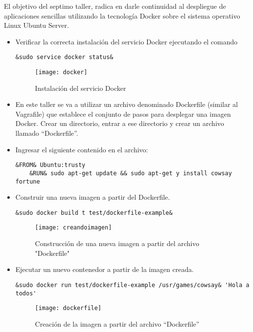 \documentclass[10pt]{article}   			%
\begin{document}
El objetivo del septimo taller, radica en darle continuidad al despliegue de aplicaciones sencillas utilizando la tecnología Docker sobre el sistema operativo Linux Ubuntu Server.

\begin{itemize}

\item Verificar la correcta instalación del servicio Docker ejecutando el comando
\begin{small}
\begin{lstlisting}[frame=single,style=base]	
	&sudo service docker status&
\end{lstlisting}
\end{small}
\begin{figure}[ht] 
	\centering
		\texttt{[image: docker]}   
	\caption{Instalación del servicio Docker} \label{fig:docker}
\end{figure}

\item En este taller se va a utilizar un archivo denominado Dockerfile (similar al Vagrafile) que establece el conjunto de pasos para desplegar una imagen Docker. Crear un directorio, entrar a ese directorio y crear un archivo llamado “Dockerfile”.

\item Ingresar el siguiente contenido en el archivo:
\begin{small}
\begin{lstlisting}[frame=single,style=base]	
	&FROM& Ubuntu:trusty
	&RUN& sudo apt-get update && sudo apt-get y install cowsay fortune
\end{lstlisting}
\end{small}

\item Construir una nueva imagen a partir del Dockerfile.
\begin{small}
\begin{lstlisting}[frame=single,style=base]	
	&sudo docker build t test/dockerfile-example&
\end{lstlisting}
\end{small}
\begin{figure}[ht] 
	\centering
		\texttt{[image: creandoimagen]}   
	\caption{Construcción de una nueva imagen a partir del archivo "Dockerfile"} \label{fig:creandoimagen}
\end{figure}

\item  Ejecutar un nuevo contenedor a partir de la imagen creada.
\begin{small}
\begin{lstlisting}[frame=single,style=base]	
	&sudo docker run test/dockerfile-example /usr/games/cowsay& 'Hola a todos'
\end{lstlisting}
\end{small}
\begin{figure}[ht] 
	\centering
		\texttt{[image: dockerfile]}   
	\caption{Creación de la imagen a partir del archivo “Dockerfile”} \label{fig:dockerfile}
\end{figure}

\end{itemize}
\end{document}
